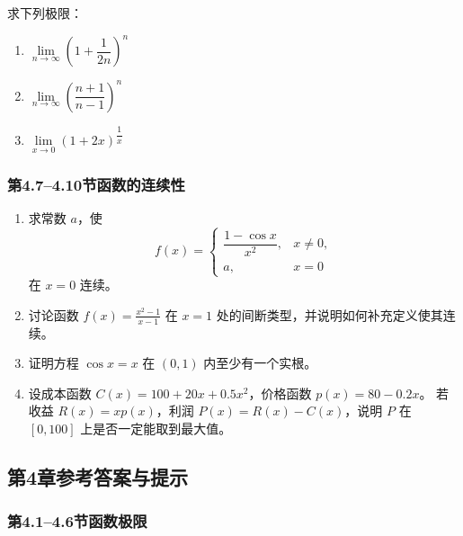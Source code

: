 \documentclass[fontset=fandol]{ctexart}
\begin{document}
\begin{exercise}求下列极限：
\begin{enumerate}
\item \(\lim\limits_{n\to\infty} \left(1 + \dfrac{1}{2n}\right)^n\)
\item \(\lim\limits_{n\to\infty} \left(\dfrac{n+1}{n-1}\right)^n\)
\item \(\lim\limits_{x\to 0} (1 + 2x)^{\dfrac{1}{x}}\)
\end{enumerate}
\end{exercise}

\subsubsection*{第4.7--4.10节\quad 函数的连续性}

\begin{enumerate}[label=\textbf{练习\arabic*.},leftmargin=2.2em]
\item 求常数 $a$，使
\[
f(x)=
\begin{cases}
\dfrac{1-\cos x}{x^2},&x\neq0,\\
a,&x=0
\end{cases}
\]
在 $x=0$ 连续。
\item 讨论函数 $f(x)=\frac{x^2-1}{x-1}$ 在 $x=1$ 处的间断类型，并说明如何补充定义使其连续。
\item 证明方程 $\cos x=x$ 在 $(0,1)$ 内至少有一个实根。
\item 设成本函数 $C(x)=100+20x+0.5x^2$，价格函数 $p(x)=80-0.2x$。 若收益 $R(x)=xp(x)$，利润 $P(x)=R(x)-C(x)$，说明 $P$ 在 $[0,100]$ 上是否一定能取到最大值。
\end{enumerate}

\subsection*{第4章参考答案与提示}

\subsubsection*{第4.1--4.6节\quad 函数极限}
\end{document}
